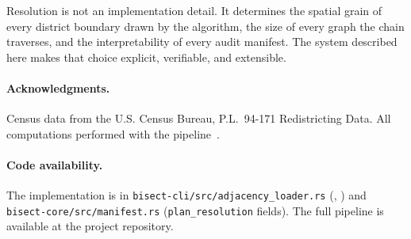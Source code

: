 Resolution is not an implementation detail.
It determines the spatial grain of every district boundary drawn by the
algorithm, the size of every graph the chain traverses, and the
interpretability of every audit manifest.
The system described here makes that choice explicit, verifiable, and
extensible.

\paragraph{Acknowledgments.}
Census data from the U.S. Census Bureau, P.L.\ 94-171 Redistricting Data.
All computations performed with the \bisect{} pipeline~\citep{dellaLibera2026b1}.

\paragraph{Code availability.}
The implementation is in \texttt{bisect-cli/src/adjacency\_loader.rs}
(\derive{}, \buildc{}) and \texttt{bisect-core/src/manifest.rs}
(\texttt{plan\_resolution} fields).
The full pipeline is available at the project repository.
